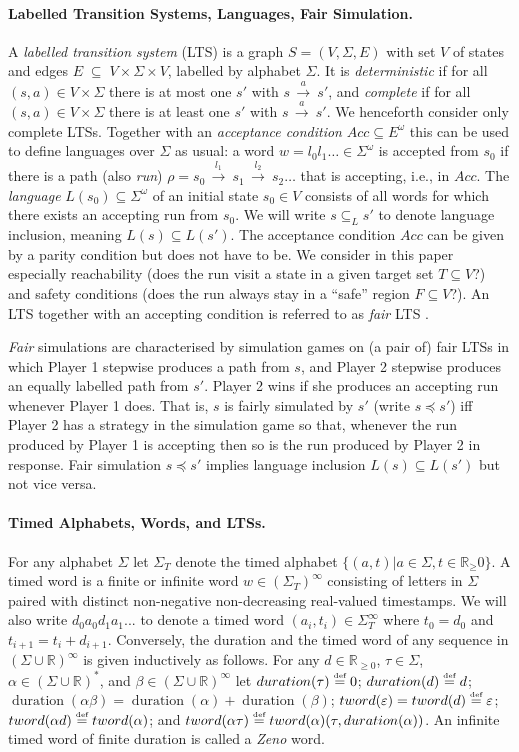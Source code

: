 \documentclass[10pt,a4paper]{amsart}
\theoremstyle{definition}
\numberwithin{equation}{section}
\newcommand{\R}{\mathbb{R}}
\newcommand{\eps}{\varepsilon}
\newcommand{\nnreals}{{\mathbb R}_{\geq 0}}
\newcommand{\x}{\times}
\newcommand{\eqby}[2][=]{\stackrel{\text{{\tiny{#2}}}}{#1}}
\newcommand{\eqdef}{\eqby{def}}
\newcommand{\acc}{\mathit{Acc}}
\newcommand{\LTSlang}{L}  %
\newcommand{\langincl}[1][L]{\subseteq_{L}}
\newcommand{\fairsim}[1][]{\preceq}
\newcommand{\dur}[1]{\mathop{duration}(#1)}
\newcommand{\tword}[1]{\mathop{tword}(#1)}
\newcommand{\step}[2][]{\Step{#2}{}{#1}}
\newcommand{\Step}[3]{\ensuremath{\,{\stackrel{#1}{\longrightarrow}}{}^{\scriptstyle{#2}}_{\scriptstyle{#3}}}\,}
\newcommand{\ltsAlphabet}{\Sigma}
\newcommand{\ltsTransitions}{E}
\newcommand{\mypar}[1]{\paragraph*{#1.}}
\begin{document}
\medskip
\mypar{Labelled Transition Systems, Languages, Fair Simulation}
A \emph{labelled transition system} (LTS)
is a graph 
$S=(V,\ltsAlphabet,\ltsTransitions)$
with set $V$ of states %
and edges $\ltsTransitions\;\subseteq\; V \x \ltsAlphabet \x V$, 
labelled by alphabet $\ltsAlphabet$.
It is \emph{deterministic} if for all $(s,a)\in V\x\ltsAlphabet$ there is at most one $s'$ with $s\step{a}s'$,
and \emph{complete} if for all $(s,a)\in V\x\ltsAlphabet$ there is at least one $s'$ with $s\step{a}s'$.
We henceforth consider only complete LTSs.
Together with an \emph{acceptance condition}
$\acc\subseteq \ltsTransitions^\omega$ this can be used to define languages over $\ltsAlphabet$ as usual:
a word $w=l_0l_1\ldots\in\ltsAlphabet^\omega$ is accepted from $s_0$ if
there is a path (also \emph{run})
$\rho=
s_0
\step{l_1}
s_1
\step{l_2}
s_2
\ldots
$
that is accepting, i.e., in $\acc$.
The \emph{language} $\LTSlang(s_0)\subseteq \ltsAlphabet^\omega$ of an initial state $s_0\in V$ 
consists of all words for which there exists an accepting run from $s_0$.
We will write $s\langincl s'$ to denote language inclusion, meaning $\LTSlang(s)\subseteq \LTSlang(s')$.
The acceptance condition $\acc$ can be given by a parity condition 
but does not have to be.
We consider in this paper especially reachability (does the run visit a state in a given target set $T\subseteq V$?)
and safety conditions (does the run always stay in a ``safe'' region $F\subseteq V$?).
An LTS together with an accepting condition is referred to as \emph{fair} LTS \cite{HKR1997}.


\emph{Fair} simulations 
\cite{HKR1997}
are characterised by simulation games on (a pair of) fair LTSs in which  Player 1 stepwise produces a path from $s$, and Player 2 stepwise produces an equally labelled path from $s'$. Player 2 wins if she produces an accepting run
whenever Player 1 does.
That is, $s$ is fairly simulated by $s'$ (write $s\fairsim s'$) iff Player 2 has a strategy in the simulation game
so that, whenever the run produced by Player 1 is accepting then so is the run produced by Player 2 in response.
Fair simulation $s\fairsim s'$ implies language inclusion $\LTSlang(s)\subseteq \LTSlang(s')$ but not vice versa.

\medskip
\mypar{Timed Alphabets, Words, and LTSs}
For any alphabet $\Sigma$ let $\Sigma_T$ denote the timed alphabet $\{(a,t)|a\in \Sigma, t\in \R_\ge0\}$. 
A timed word is a finite or infinite word $w\in (\Sigma_T)^\infty$ consisting of letters in $\Sigma$ paired with distinct non-negative non-decreasing real-valued timestamps. %
We will also write $d_0a_0d_1a_1...$ to denote a timed word $(a_i,t_i)\in\Sigma_T^\infty$ where $t_0=d_0$ and $t_{i+1}=t_i+d_{i+1}$.
Conversely, the duration and the timed word
of any sequence in $(\Sigma\cup\R)^\infty$
is given inductively as follows.
For any
$d\in\nnreals$,
${\tau\in\Sigma}$,
$\alpha\in(\Sigma\cup\R)^*$,
and
$\beta\in(\Sigma\cup\R)^\infty$
let
$\dur{\tau}\eqdef 0$;
$\dur{d}\eqdef d$;
$\dur{\alpha\beta}=\dur{\alpha}+\dur{\beta}$;
$\tword{{\eps}}=\tword{d}\eqdef\eps$;
$\tword{{\alpha d}}\eqdef\tword{\alpha}$; and %
$\tword{{\alpha \tau}}\eqdef\tword{\alpha}(\tau,\dur{\alpha})$.
An infinite timed word of finite duration is called a \emph{Zeno} word. 
\end{document}
